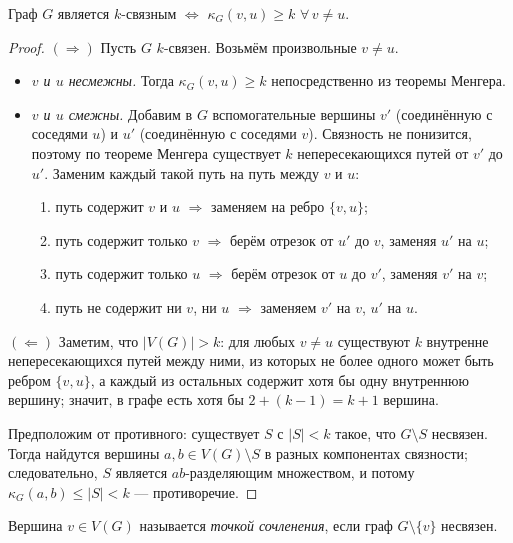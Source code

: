 \begin{Theorem}{}{}
	Граф $G$ является $k$-связным $\Leftrightarrow$
	$\kappa_G(v, u) \geq k$  $\forall \, v \neq u$.
\end{Theorem}
\begin{proof}
	$(\Rightarrow)$
	Пусть $G$ $k$-связен. Возьмём произвольные $v \neq u$.
	
	\begin{itemize}
		\item \textit{$v$ и $u$ несмежны.} Тогда $\kappa_G(v,u) \geq k$
		непосредственно из теоремы Менгера.
		
		\item \textit{$v$ и $u$ смежны.} Добавим в $G$ вспомогательные
		вершины $v'$ (соединённую с соседями $u$) и $u'$
		(соединённую с соседями $v$). Связность не понизится,
		поэтому по теореме Менгера существует $k$
		непересекающихся путей от $v'$ до $u'$.
		Заменим каждый такой путь на путь между $v$ и $u$:
		\begin{enumerate}
			\item путь содержит $v$ и $u$
			$\Rightarrow$ заменяем на ребро $\{v,u\}$;
			\item путь содержит только $v$
			$\Rightarrow$ берём отрезок от $u'$ до $v$,
			заменяя $u'$ на $u$;
			\item путь содержит только $u$
			$\Rightarrow$ берём отрезок от $u$ до $v'$,
			заменяя $v'$ на $v$;
			\item путь не содержит ни $v$, ни $u$
			$\Rightarrow$ заменяем $v'$ на $v$, $u'$ на $u$.
		\end{enumerate}
	\end{itemize}
	
	$(\Leftarrow)$
	Заметим, что $|V(G)| > k$: для любых $v \neq u$
	существуют $k$ внутренне непересекающихся путей между ними,
	из которых не более одного может быть ребром $\{v,u\}$, а каждый
	из остальных содержит хотя бы одну внутреннюю вершину; значит,
	в графе есть хотя бы $2+(k-1)=k+1$ вершина.
	
	Предположим от противного: существует $S$ с $|S| < k$ такое,
	что $G \setminus S$ несвязен. Тогда найдутся вершины
	$a, b \in V(G) \setminus S$ в разных компонентах связности;
	следовательно, $S$ является $ab$-разделяющим множеством, и потому
	$\kappa_G(a,b) \le |S| < k$ --- противоречие.
\end{proof}

\begin{Definition}{}{}
	Вершина $v \in V(G)$ называется \emph{точкой сочленения},
	если граф $G \setminus \{v\}$ несвязен.
\end{Definition}

